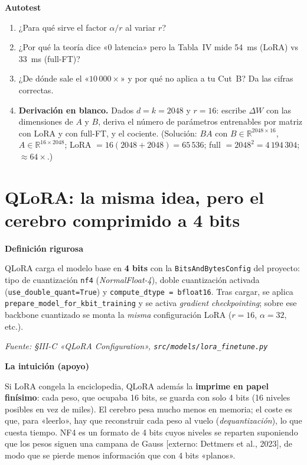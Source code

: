\documentclass[11pt,a4paper]{article}
\newcommand{\nivel}[1]{\medskip\noindent\textbf{\textcolor{blue!45!black}{#1}}\par\nopagebreak\smallskip}
\newcommand{\fuente}[1]{\nopagebreak\par\hfill{\footnotesize\textit{Fuente: #1}}\par}
\newcommand{\externo}[1]{{\footnotesize\textcolor{red!55!black}{[externo: #1]}}}
\begin{document}
\nivel{Autotest}
\begin{enumerate}[nosep]
  \item ¿Para qué sirve el factor $\alpha/r$ al variar $r$?
  \item ¿Por qué la teoría dice «0 latencia» pero la Tabla~IV mide 54~ms (LoRA) vs 33~ms (full-FT)?
  \item ¿De dónde sale el «$10\,000\times$» y por qué no aplica a tu Cut~B? Da las cifras correctas.
  \item \textbf{Derivación en blanco.} Dados $d=k=2048$ y $r=16$: escribe $\Delta W$ con las
        dimensiones de $A$ y $B$, deriva el número de parámetros entrenables por matriz con LoRA y
        con full-FT, y el cociente. (Solución: $BA$ con $B\in\mathbb{R}^{2048\times16}$,
        $A\in\mathbb{R}^{16\times2048}$; LoRA $=16(2048{+}2048)=65\,536$; full $=2048^2=4\,194\,304$;
        $\approx 64\times$.)
\end{enumerate}

\section{QLoRA: la misma idea, pero el cerebro comprimido a 4 bits}\label{sec:qlora}

\nivel{Definición rigurosa}
QLoRA carga el modelo base en \textbf{4 bits} con la \texttt{BitsAndBytesConfig} del proyecto: tipo
de cuantización \texttt{nf4} (\emph{NormalFloat-4}), doble cuantización activada
(\texttt{use\_double\_quant=True}) y \texttt{compute\_dtype = bfloat16}. Tras cargar, se aplica
\texttt{prepare\_model\_for\_kbit\_training} y se activa \emph{gradient checkpointing}; sobre ese
backbone cuantizado se monta la \emph{misma} configuración LoRA ($r=16$, $\alpha=32$, etc.).
\fuente{\S III-C «QLoRA Configuration», \texttt{src/models/lora\_finetune.py}}

\nivel{La intuición (apoyo)}
Si LoRA congela la enciclopedia, QLoRA además la \textbf{imprime en papel finísimo}: cada peso, que
ocupaba 16 bits, se guarda con solo 4 bits (16 niveles posibles en vez de miles). El cerebro pesa
mucho menos en memoria; el coste es que, para «leerlo», hay que reconstruir cada peso al vuelo
(\emph{dequantización}), lo que cuesta tiempo. NF4 es un formato de 4 bits cuyos niveles se reparten
suponiendo que los pesos siguen una campana de Gauss \externo{Dettmers et al., 2023}, de modo que se
pierde menos información que con 4 bits «planos».
\end{document}
